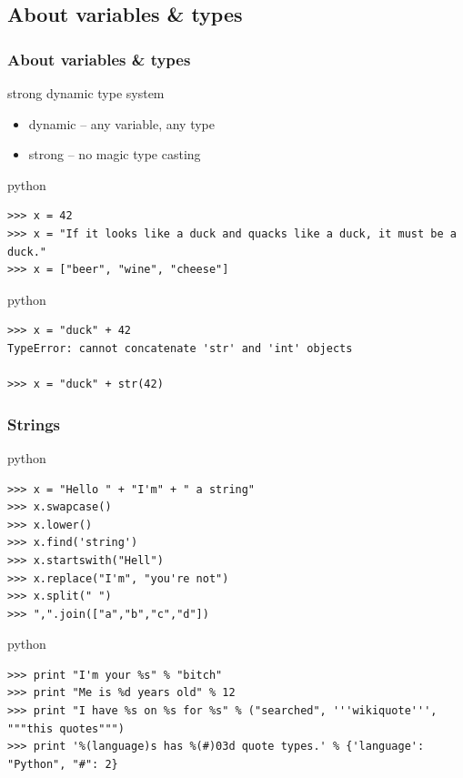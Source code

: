 \documentclass{beamer}
\begin{document}
\subsection{About variables \& types}
\begin{frame}[fragile]
	\frametitle{About variables \& types}
	\begin{block}{strong dynamic type system}
	\begin{itemize}
	\item dynamic -- any variable, any type
	\item strong -- no magic type casting
	\end{itemize}
	\end{block}
\pause
	\begin{exampleblock}{python}
	\begin{lstlisting}
>>> x = 42
>>> x = "If it looks like a duck and quacks like a duck, it must be a duck."
>>> x = ["beer", "wine", "cheese"]
	\end{lstlisting}
	\end{exampleblock}

\pause

	\begin{exampleblock}{python}
	\begin{lstlisting}
>>> x = "duck" + 42
TypeError: cannot concatenate 'str' and 'int' objects

>>> x = "duck" + str(42)
	\end{lstlisting}
	\end{exampleblock}
\end{frame}

\begin{frame}[fragile]
	\frametitle{Strings}
	
	\begin{exampleblock}{python}
	\begin{lstlisting}
>>> x = "Hello " + "I'm" + " a string"
>>> x.swapcase()
>>> x.lower()
>>> x.find('string')
>>> x.startswith("Hell")
>>> x.replace("I'm", "you're not")
>>> x.split(" ")
>>> ",".join(["a","b","c","d"])
	\end{lstlisting}
	\end{exampleblock}

\pause

	\begin{exampleblock}{python}
	\begin{lstlisting}
>>> print "I'm your %s" % "bitch"
>>> print "Me is %d years old" % 12
>>> print "I have %s on %s for %s" % ("searched", '''wikiquote''', """this quotes""")
>>> print '%(language)s has %(#)03d quote types.' % {'language': "Python", "#": 2}
	\end{lstlisting}
	\end{exampleblock}
\end{frame}
\end{document}
